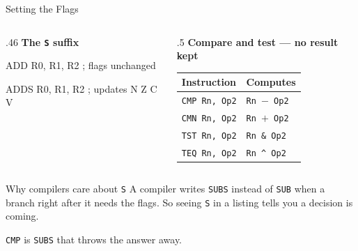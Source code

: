 \documentclass[9pt,aspectratio=169,xcolor=table]{beamer}
\begin{document}
\begin{frame}[fragile]{Setting the Flags}
    \begin{columns}[T]
    \begin{column}{.46\textwidth}
        \textbf{The \texttt{S} suffix}

        \vspace{1mm}
        \begin{asm}[basicstyle=\footnotesize\ttfamily]
ADD  R0, R1, R2   ; flags unchanged

ADDS R0, R1, R2   ; updates N Z C V
        \end{asm}
    \end{column}
    \begin{column}{.5\textwidth}
        \textbf{Compare and test --- no result kept}

        \vspace{1mm}
        {\small
        \striped
        \begin{tabular}{@{}l l@{}}
            \toprule
            \textbf{Instruction} & \textbf{Computes} \\
            \midrule
            \texttt{CMP Rn, Op2} & \texttt{Rn $-$ Op2} \\
            \texttt{CMN Rn, Op2} & \texttt{Rn $+$ Op2} \\
            \texttt{TST Rn, Op2} & \texttt{Rn \& Op2} \\
            \texttt{TEQ Rn, Op2} & \texttt{Rn \^{} Op2} \\
            \bottomrule
        \end{tabular}}
    \end{column}
    \end{columns}

    \vspace{3mm}
    \begin{block}{Why compilers care about \texttt{S}}
        A compiler writes \texttt{SUBS} instead of \texttt{SUB} when a
        branch right after it needs the flags. So seeing \texttt{S} in a
        listing tells you \alert{a decision is coming}.
    \end{block}

    \vspace{1mm}
    {\small \texttt{CMP} is \texttt{SUBS} that throws the answer away.}
\end{frame}
\end{document}

